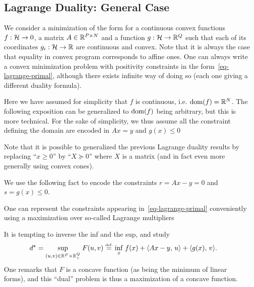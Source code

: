 \subsection{Lagrange Duality: General Case}

We consider a minimization of the form
for a continuous convex functions $f : \mathcal{H} \rightarrow 0$, a matrix $A \in \mathbb{R}^{P \times N}$ and a function $g : \mathcal{H} \rightarrow \mathbb{R}^Q$ such that each of its coordinates $g_i : \mathcal{H} \rightarrow \mathbb{R}$ are continuous and convex.  
%
Note that it is always the case that equality in convex program corresponds to affine ones. 
%
One can always write a convex minimization problem with positivity constraints in the form~\eqref{eq-lagrange-primal}, although there exists infinite way of doing so (each one giving a different duality formula). 

Here we have assumed for simplicity that $f$ is continuous, i.e. $\operatorname{dom}(f)=\mathbb{R}^N$.
%
The following exposition can be generalized to $\operatorname{dom}(f)$ being arbitrary, but this is more technical. For the sake of simplicity, we thus assume all the constraint defining the domain are encoded in $Ax=y$ and $g(x) \leq 0$


Note that it is possible to generalized the previous Lagrange duality results by replacing ``$x \geq 0$'' by ``$X \succeq 0$'' where $X$ is a matrix (and in fact even more generally using convex cones). 

We use the following fact
to encode the constraints $r=Ax-y=0$ and $s=g(x) \leq 0$.

One can represent the constraints appearing in~\eqref{eq-lagrange-primal} conveniently using a maximization over so-called Lagrange multipliers

It is tempting to inverse the inf and the sup, and study 
\begin{align}\label{eq-lagrange-dual}
	d^\star = \underset{(u,v) \in \mathbb{R}^P \times \mathbb{R}_+^Q }{\sup}\; F(u,v) &\stackrel{\mbox{\upshape\tiny def.}}{=} \underset{x}{\inf}\;  f(x) + \langle Ax-y,\,u\rangle + \langle g(x),\,v\rangle.
\end{align}
One remarks that $F$ is a concave function (as being the minimum of linear forms), and this ``dual'' problem is thus a maximization of a concave function. 


